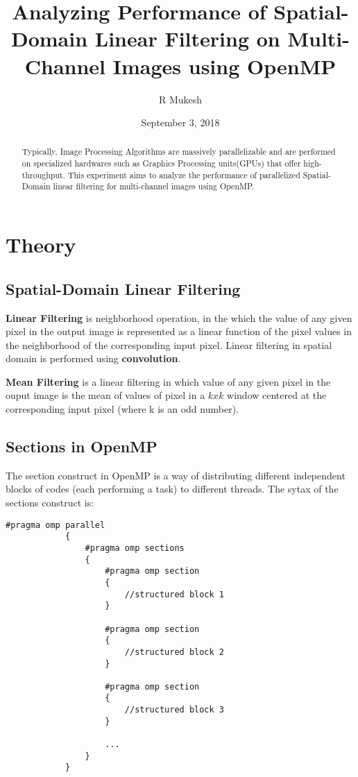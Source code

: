 \documentclass{article}
\title{Analyzing Performance of Spatial-Domain Linear Filtering on Multi-Channel Images using OpenMP}
\author{R Mukesh}
\affil{IIITDM, Kancheepuram}
\date{September 3, 2018}
\begin{document}
	\maketitle
	
	\begin{abstract}
		Typically, Image Processing Algorithms are massively parallelizable and are performed on specialized hardwares such as Graphics Processing units(GPUs) that offer high-throughput. This experiment aims to analyze the performance of parallelized Spatial-Domain linear filtering for multi-channel images using OpenMP.
	\end{abstract}
	
	\section{Theory}
	
		\subsection{Spatial-Domain Linear Filtering}
			\textbf{Linear Filtering} is neighborhood operation, in the which the value of any given pixel in the output image is represented as a linear function of the pixel values in the neighborhood of the corresponding input pixel. Linear filtering in spatial domain is performed using \textbf{convolution}.
			
			\textbf{Mean Filtering} is a linear filtering in which value of any given pixel in the ouput image is the mean of values of pixel in a \(kxk\) window centered at the corresponding input pixel (where k is an odd number).
					
		\subsection{Sections in OpenMP}
			
			The section construct in OpenMP is a way of distributing different independent blocks of codes (each performing a task) to different threads. The sytax of the sections construct is:
			
		\begin{lstlisting}[style=CStyle]
			#pragma omp parallel
			{
				#pragma omp sections
				{
					#pragma omp section
					{
						//structured block 1
					}
					
					#pragma omp section
					{
						//structured block 2
					}
					
					#pragma omp section
					{
						//structured block 3
					}
					
					...
				}
			}
		\end{lstlisting}				
			
\end{document}
